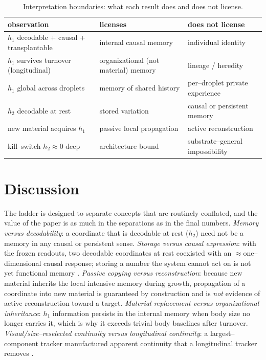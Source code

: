 \documentclass[11pt]{article}
\begin{document}
\begin{table}[t]\centering\small
\caption{Interpretation boundaries: what each result does and does not license.}
\label{tab:boundaries}
\begin{tabular}{@{}lll@{}}\toprule
observation & licenses & does not license\\\midrule
$h_1$ decodable + causal + transplantable & internal causal memory & individual identity\\
$h_1$ survives turnover (longitudinal) & organizational (not material) memory & lineage / heredity\\
$h_1$ global across droplets & memory of shared history & per--droplet private experience\\
$h_2$ decodable at rest & stored variation & causal or persistent memory\\
new material acquires $h_1$ & passive local propagation & active reconstruction\\
kill--switch $h_2\approx0$ deep & architecture bound & substrate--general impossibility\\\bottomrule
\end{tabular}
\end{table}

\section{Discussion}
The ladder is designed to separate concepts that are routinely conflated, and the value of the paper is as much in
the separations as in the final numbers. \emph{Memory versus decodability}: a coordinate that is decodable at rest
($h_2$) need not be a memory in any causal or persistent sense. \emph{Storage versus causal expression}: with the
frozen readouts, two decodable coordinates at rest coexisted with an $\approx$one--dimensional causal response;
storing a number the system cannot act on is not yet functional memory \citep{pearl2009}. \emph{Passive copying
versus reconstruction}: because new material inherits the local intensive memory during growth, propagation of a
coordinate into new material is guaranteed by construction and is \emph{not} evidence of active reconstruction
toward a target. \emph{Material replacement versus organizational inheritance}: $h_1$ information persists in the
internal memory when body size no longer carries it, which is why it exceeds trivial body baselines after turnover.
\emph{Visual/size--reselected continuity versus longitudinal continuity}: a largest--component tracker manufactured
apparent continuity that a longitudinal tracker removes \citep{jaqaman2008,rosenfeld1966}.
\end{document}
